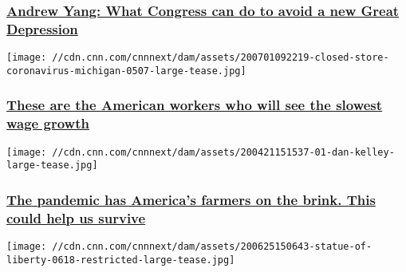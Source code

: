 \hypertarget{andrew-yang-what-congress-can-do-to-avoid-a-new-great-depression}{%
\subsubsection{\texorpdfstring{\href{/2020/07/02/perspectives/andrew-yang-coronavirus-aid-direct-payments/index.html}{Andrew
Yang: What Congress can do to avoid a new Great
Depression}}{Andrew Yang: What Congress can do to avoid a new Great Depression}}\label{andrew-yang-what-congress-can-do-to-avoid-a-new-great-depression}}

\href{/2020/07/01/perspectives/wage-growth-pandemic-us-economy/index.html}{}

\texttt{[image: //cdn.cnn.com/cnnnext/dam/assets/200701092219-closed-store-coronavirus-michigan-0507-large-tease.jpg]}

\hypertarget{these-are-the-american-workers-who-will-see-the-slowest-wage-growth}{%
\subsubsection{\texorpdfstring{\href{/2020/07/01/perspectives/wage-growth-pandemic-us-economy/index.html}{These
are the American workers who will see the slowest wage
growth}}{These are the American workers who will see the slowest wage growth}}\label{these-are-the-american-workers-who-will-see-the-slowest-wage-growth}}

\href{/2020/06/30/perspectives/farmers-trade-pandemic/index.html}{}

\texttt{[image: //cdn.cnn.com/cnnnext/dam/assets/200421151537-01-dan-kelley-large-tease.jpg]}

\hypertarget{the-pandemic-has-americas-farmers-on-the-brink-this-could-help-us-survive}{%
\subsubsection{\texorpdfstring{\href{/2020/06/30/perspectives/farmers-trade-pandemic/index.html}{The
pandemic has America's farmers on the brink. This could help us
survive}}{The pandemic has America's farmers on the brink. This could help us survive}}\label{the-pandemic-has-americas-farmers-on-the-brink-this-could-help-us-survive}}

\href{/2020/06/26/perspectives/work-visa-restrictions-us-economy/index.html}{}

\texttt{[image: //cdn.cnn.com/cnnnext/dam/assets/200625150643-statue-of-liberty-0618-restricted-large-tease.jpg]}

